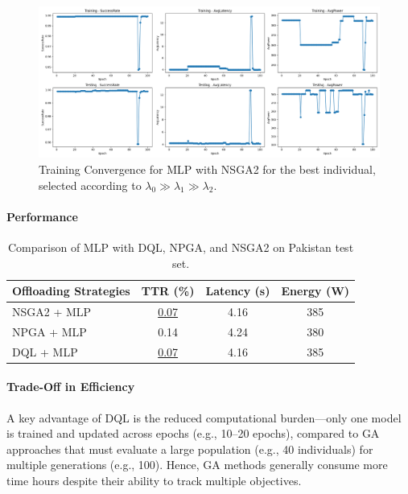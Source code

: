 \documentclass[preprint,3p,authoryear]{elsarticle}
\begin{document}
\begin{figure}[H]
    \centering
    \includegraphics[width=0.95\linewidth]{figs/nsga2_mlp_training_epoch.png}
    \caption{Training Convergence for MLP with NSGA2 for the best individual, selected according to \(\lambda_0 \gg \lambda_1 \gg \lambda_2\).}  
    \label{fig:nsga2-mlp-training-epoch}  
\end{figure}



\paragraph{Performance}

\begin{table}[htbp]
\centering


\begin{tabular}{lccc}

\textbf{Offloading Strategies} & \textbf{TTR (\%)} & \textbf{Latency (s)} & \textbf{Energy (W)} \\

\hline

NSGA2 + MLP 
 & \underline{0.07} 
 & 4.16
 & 385 \\
 
NPGA + MLP 
 & 0.14 
 & 4.24 
 & 380 \\
 
DQL + MLP 
 & \underline{0.07} 
 & 4.16 
 & 385 \\
 


\end{tabular}

\caption{Comparison of MLP with DQL, NPGA, and NSGA2 on Pakistan test set.}\label{tab:mlp_comparison}
\end{table}



\paragraph{Trade-Off in Efficiency}
A key advantage of DQL is the reduced computational burden—only one model is trained and updated across epochs (e.g., 10–20 epochs), compared to GA approaches that must evaluate a large population (e.g., 40 individuals) for multiple generations (e.g., 100). Hence, GA methods generally consume more time hours despite their ability to track multiple objectives.
\end{document}
